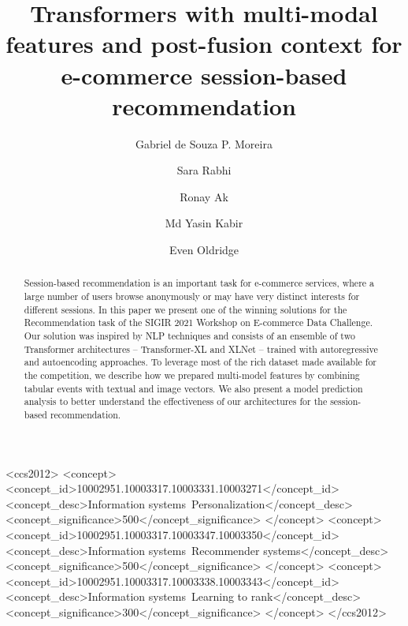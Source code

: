 \documentclass[sigconf,screen]{acmart}
\begin{document}
\title{Transformers with multi-modal features and post-fusion context for e-commerce session-based recommendation}



\author{Gabriel de Souza P. Moreira}

\author{Sara Rabhi}


\author{Ronay Ak}

\author{Md Yasin Kabir}

\author{Even Oldridge}


\renewcommand{\shortauthors}{}

\begin{abstract}
Session-based recommendation is an important task for e-commerce services, where a large number of users browse anonymously or may have very distinct interests for different sessions. In this paper we present one of the winning solutions for the Recommendation task of the SIGIR 2021 Workshop on E-commerce Data Challenge. Our solution was inspired by NLP techniques and consists of an ensemble of two Transformer architectures -- Transformer-XL and XLNet -- trained with autoregressive and autoencoding approaches. To leverage most of the rich dataset made available for the competition, we describe how we prepared multi-model features by combining tabular events with textual and image vectors. We also present a model prediction analysis  to better understand the effectiveness of our architectures for the session-based recommendation.
\end{abstract}

\begin{CCSXML}
<ccs2012>
<concept>
<concept_id>10002951.10003317.10003331.10003271</concept_id>
<concept_desc>Information systems~Personalization</concept_desc>
<concept_significance>500</concept_significance>
</concept>
<concept>
<concept_id>10002951.10003317.10003347.10003350</concept_id>
<concept_desc>Information systems~Recommender systems</concept_desc>
<concept_significance>500</concept_significance>
</concept>
<concept>
<concept_id>10002951.10003317.10003338.10003343</concept_id>
<concept_desc>Information systems~Learning to rank</concept_desc>
<concept_significance>300</concept_significance>
</concept>
</ccs2012>
\end{CCSXML}
\end{document}
